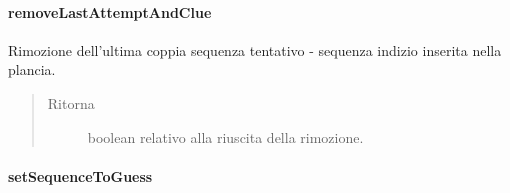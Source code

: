 \documentclass[letterpaper,10pt,italian,openany,oneside]{sphinxmanual}
\begin{document}
\paragraph{removeLastAttemptAndClue}
\label{\detokenize{test/it/unicam/cs/pa/mastermind/gamecore/BoardModel:removelastattemptandclue}}

\begin{fulllineitems}
\label{\detokenize{test/it/unicam/cs/pa/mastermind/gamecore/BoardModel:it.unicam.cs.pa.mastermind.gamecore.BoardModel.removeLastAttemptAndClue()}}
Rimozione dell’ultima coppia sequenza tentativo - sequenza indizio inserita nella plancia.
\begin{quote}\begin{description}
\item[{Ritorna}] \leavevmode
boolean relativo alla riuscita della rimozione.

\end{description}\end{quote}

\end{fulllineitems}



\paragraph{setSequenceToGuess}
\label{\detokenize{test/it/unicam/cs/pa/mastermind/gamecore/BoardModel:setsequencetoguess}}
\end{document}
